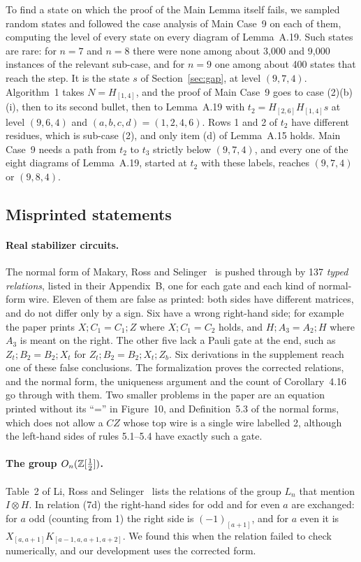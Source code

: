 To find a state on which the proof of the Main Lemma itself fails, we
sampled random states and followed the case analysis of Main Case~9 on
each of them, computing the level of every state on every diagram of
Lemma~A.19. Such states are rare: for $n=7$ and $n=8$ there were none
among about 3{,}000 and 9{,}000 instances of the relevant sub-case,
and for $n=9$ one among about 400 states that reach the step. It is
the state $s$ of Section~\ref{sec:gap}, at level $(9,7,4)$. Algorithm~1
takes $N=H_{[1,4]}$, and the proof of Main Case~9 goes to case
(2)(b)(i), then to its second bullet, then to Lemma~A.19 with
$t_2=H_{[2,6]}H_{[1,4]}s$ at level $(9,6,4)$ and $(a,b,c,d)=(1,2,4,6)$.
Rows 1 and 2 of $t_2$ have different residues, which is sub-case (2),
and only item (d) of Lemma~A.15 holds. Main Case~9 needs a path from
$t_2$ to $t_3$ strictly below $(9,7,4)$, and every one of the eight
diagrams of Lemma~A.19, started at $t_2$ with these labels, reaches
$(9,7,4)$ or $(9,8,4)$.

\subsection{Misprinted statements}\label{sec:misprints}

\paragraph{Real stabilizer circuits.} The normal form of Makary, Ross and
Selinger~\cite{makary2021real} is pushed through by 137 \emph{typed
relations}, listed in their Appendix~B, one for each gate and each kind
of normal-form wire. Eleven of them are false as printed: both sides
have different matrices, and do not differ only by a sign. Six have a
wrong right-hand side; for example the paper prints $X;C_1 = C_1;Z$
where $X;C_1=C_2$ holds, and $H;A_3 = A_2;H$ where $A_3$ is meant on the
right. The other five lack a Pauli gate at the end, such as $Z_t;B_2 =
B_2;X_t$ for $Z_t;B_2 = B_2;X_t;Z_b$. Six derivations in the supplement
reach one of these false conclusions. The formalization proves the
corrected relations, and the normal form, the uniqueness argument and
the count of Corollary~4.16 go through with them. Two smaller problems
in the paper are an equation printed without its ``='' in Figure~10,
and Definition~5.3 of the normal forms, which does not allow a $CZ$
whose top wire is a single wire labelled 2, although the left-hand
sides of rules 5.1--5.4 have exactly such a gate.

\paragraph{The group \texorpdfstring{$O_n(\mathbb{Z}[\frac12])$}{On(Z[1/2])}.} Table~2 of Li, Ross and
Selinger~\cite{li2021on} lists the relations of the group $L_n$ that
mention $I\otimes H$. In relation (7d) the right-hand sides for odd and
for even $a$ are exchanged: for $a$ odd (counting from 1) the right
side is $(-1)_{[a+1]}$, and for $a$ even it is
$X_{[a,a+1]}K_{[a-1,a,a+1,a+2]}$. We found this when the relation
failed to check numerically, and our development uses the corrected
form.

